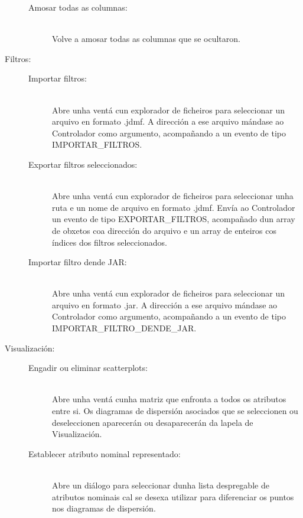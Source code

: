 \begin{description}
\begin{description}
\item[Amosar todas as columnas:] \hfill \\
Volve a amosar todas as columnas que se ocultaron.

\end{description}

\item[Filtros:] \hfill

\begin{description}

\item[Importar filtros:] \hfill \\
Abre unha ventá cun explorador de ficheiros para seleccionar un arquivo en formato .jdmf. A dirección a ese arquivo mándase ao Controlador como argumento, acompañando a un evento de tipo IMPORTAR\_FILTROS.

\item[Exportar filtros seleccionados:] \hfill \\
Abre unha ventá cun explorador de ficheiros para seleccionar unha ruta e un nome de arquivo en formato .jdmf. Envía ao Controlador un evento de tipo EXPORTAR\_FILTROS, acompañado dun array de obxetos coa dirección do arquivo e un array de enteiros cos índices dos filtros seleccionados.

\item[Importar filtro dende JAR:] \hfill \\
Abre unha ventá cun explorador de ficheiros para seleccionar un arquivo en formato .jar. A dirección a ese arquivo mándase ao Controlador como argumento, acompañando a un evento de tipo IMPORTAR\_FILTRO\_DENDE\_JAR.

\end{description}

\item[Visualización:] \hfill

\begin{description}

\item[Engadir ou eliminar scatterplots:] \hfill \\
Abre unha ventá cunha matriz que enfronta a todos os atributos entre si. Os diagramas de dispersión asociados que se seleccionen ou deseleccionen aparecerán ou desaparecerán da lapela de Visualización.

\item[Establecer atributo nominal representado:] \hfill \\
Abre un diálogo para seleccionar dunha lista despregable de atributos nominais cal se desexa utilizar para diferenciar os puntos nos diagramas de dispersión.


\end{description}
\end{description}
